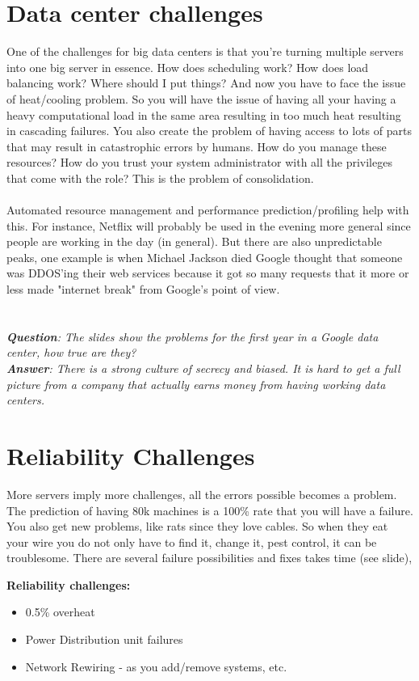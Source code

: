 \documentclass[twoside]{article}
\begin{document}
\section{Data center challenges}
One of the challenges for big data centers is that you're turning multiple servers into one big server in essence. How does scheduling work? How does load balancing work? Where should I put things? And now you have to face the issue of heat/cooling problem. So you will have the issue of having all your having a heavy computational load in the same area resulting in too much heat resulting in cascading failures. You also create the problem of having access to lots of parts that may result in catastrophic errors by humans. How do you manage these resources? How do you trust your system administrator with all the privileges that come with the role? This is the problem of consolidation. 
\\\\
Automated resource management and performance prediction/profiling help with this. For instance, Netflix will probably be used in the evening more general since people are working in the day (in general). But there are also unpredictable peaks, one example is when Michael Jackson died Google thought that someone was DDOS'ing their web services because it got so many requests that it more or less made "internet break" from Google's point of view. 
\\\\
\\\emph{\textbf{Question}: The slides show the problems for the first year in a Google data center, how true are they?}
\\\emph{\textbf{Answer}: There is a strong culture of secrecy and biased. It is hard to get a full picture from a company that actually earns money from having working data centers.}


\section{Reliability Challenges}
More servers imply more challenges, all the errors possible becomes a problem. The prediction of having 80k machines is a 100\% rate that you will have a failure. You also get new problems, like rats since they love cables. So when they eat your wire you do not only have to find it, change it, pest control, it can be troublesome. There are several failure possibilities and fixes takes time (see slide), 

 \textbf{Reliability challenges:} 
 \begin{itemize}
  \item 0.5\% overheat
  \item Power Distribution unit failures 
  \item Network Rewiring - as you add/remove systems, etc.
\end{itemize}
\end{document}
